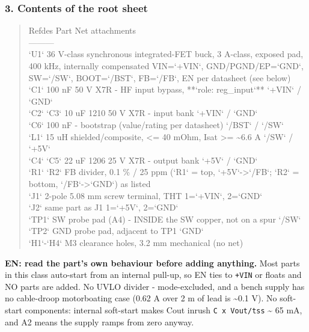 \documentclass[11pt,a4paper]{article}
\begin{document}
\subsubsection*{3. Contents of the root sheet}
\begin{quote}\small\ttfamily\raggedright
\textbar{} Refdes \textbar{} Part \textbar{} Net attachments \textbar{}\\
\textbar{}---\textbar{}---\textbar{}---\textbar{}\\
\textbar{} `U1` \textbar{} 36 V-class synchronous integrated-FET buck, 3 A-class, exposed pad, 400 kHz, internally compensated \textbar{} VIN=`+VIN`, GND/PGND/EP=`GND`, SW=`/SW`, BOOT=`/BST`, FB=`/FB`, EN per datasheet (see below) \textbar{}\\
\textbar{} `C1` \textbar{} 100 nF 50 V X7R - HF input bypass, {*}{*}`role: reg\_input`{*}{*} \textbar{} `+VIN` / `GND` \textbar{}\\
\textbar{} `C2` `C3` \textbar{} 10 uF 1210 50 V X7R - input bank \textbar{} `+VIN` / `GND` \textbar{}\\
\textbar{} `C6` \textbar{} 100 nF - bootstrap (value/rating per datasheet) \textbar{} `/BST` / `/SW` \textbar{}\\
\textbar{} `L1` \textbar{} 15 uH shielded/composite, \textless{}= 40 mOhm, Isat \textgreater{}= \textasciitilde{}6.6 A \textbar{} `/SW` / `+5V` \textbar{}\\
\textbar{} `C4` `C5` \textbar{} 22 uF 1206 25 V X7R - output bank \textbar{} `+5V` / `GND` \textbar{}\\
\textbar{} `R1` `R2` \textbar{} FB divider, 0.1 \% / 25 ppm (`R1` = top, `+5V`-\textgreater{}`/FB`; `R2` = bottom, `/FB`-\textgreater{}`GND`) \textbar{} as listed \textbar{}\\
\textbar{} `J1` \textbar{} 2-pole 5.08 mm screw terminal, THT \textbar{} 1=`+VIN`, 2=`GND` \textbar{}\\
\textbar{} `J2` \textbar{} same part as J1 \textbar{} 1=`+5V`, 2=`GND` \textbar{}\\
\textbar{} `TP1` \textbar{} SW probe pad (A4) - INSIDE the SW copper, not on a spur \textbar{} `/SW` \textbar{}\\
\textbar{} `TP2` \textbar{} GND probe pad, adjacent to TP1 \textbar{} `GND` \textbar{}\\
\textbar{} `H1`-`H4` \textbar{} M3 clearance holes, 3.2 mm \textbar{} mechanical (no net) \textbar{}
\end{quote}
\textbf{EN: read the part's own behaviour before adding anything.} Most parts in this class auto-start from an internal pull-up, so EN ties to \texttt{+VIN} or floats and NO parts are added. No UVLO divider - mode-excluded, and a bench supply has no cable-droop motorboating case (0.62 A over 2 m of lead is \textasciitilde{}0.1 V). No soft-start components: internal soft-start makes Cout inrush \texttt{C x Vout/tss} \textasciitilde{} 65 mA, and A2 means the supply ramps from zero anyway.
\end{document}
